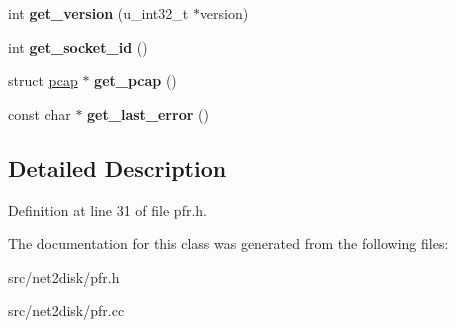 \begin{DoxyCompactItemize}
\item 
\hypertarget{class_p_f_r_ac708a2d4f195584d7fa2cb41c7c44997}{
int {\bfseries get\_\-version} (u\_\-int32\_\-t $\ast$version)}
\label{class_p_f_r_ac708a2d4f195584d7fa2cb41c7c44997}

\item 
\hypertarget{class_p_f_r_ab8045e70335f0d352e541090e9129343}{
int {\bfseries get\_\-socket\_\-id} ()}
\label{class_p_f_r_ab8045e70335f0d352e541090e9129343}

\item 
\hypertarget{class_p_f_r_a9c7089415ca0a65f55bf92e6a4d5cd1b}{
struct \hyperlink{structpcap}{pcap} $\ast$ {\bfseries get\_\-pcap} ()}
\label{class_p_f_r_a9c7089415ca0a65f55bf92e6a4d5cd1b}

\item 
\hypertarget{class_p_f_r_af025f65d94767bd56b38f33652b45094}{
const char $\ast$ {\bfseries get\_\-last\_\-error} ()}
\label{class_p_f_r_af025f65d94767bd56b38f33652b45094}

\end{DoxyCompactItemize}


\subsection{Detailed Description}


Definition at line 31 of file pfr.h.



The documentation for this class was generated from the following files:\begin{DoxyCompactItemize}
\item 
src/net2disk/pfr.h\item 
src/net2disk/pfr.cc\end{DoxyCompactItemize}
